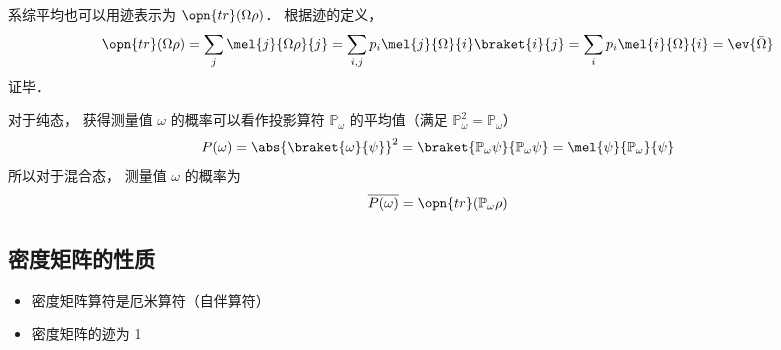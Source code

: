 系综平均也可以用迹表示为 $\opn{tr}(\Omega\rho)$． 根据迹的定义，
\begin{equation}
\opn{tr}(\Omega\rho) = \sum_j \mel{j}{\Omega\rho}{j} = \sum_{i,j} p_i\mel{j}{\Omega}{i} \braket{i}{j} = \sum_{i} p_i\mel{i}{\Omega}{i} = \ev{\bar\Omega}
\end{equation}
证毕．

对于纯态， 获得测量值 $\omega$ 的概率可以看作投影算符 $\mathbb P_\omega$ 的平均值（满足 $\mathbb P_\omega^2 = \mathbb P_\omega$）
\begin{equation}
P(\omega) = \abs{\braket{\omega}{\psi}}^2 = \braket{\mathbb P_\omega \psi}{\mathbb P_\omega \psi} = \mel{\psi}{\mathbb P_\omega}{\psi}
\end{equation}
所以对于混合态， 测量值 $\omega$ 的概率为
\begin{equation}
\overline{P(\omega)} = \opn{tr}(\mathbb P_\omega\rho)
\end{equation}

\subsection{密度矩阵的性质}
\begin{itemize}
\item 密度矩阵算符是厄米算符（自伴算符）

\item 密度矩阵的迹为 1
\end{itemize}
